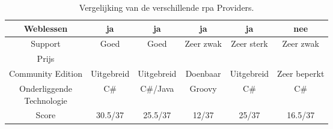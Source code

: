 \begin{sidewaystable}[h!]
\begin{tabular}{|c||c|c|c|c|c|}
		\hline
		Weblessen & ja & ja & ja & ja & nee \\
		\hline
		Support & Goed & Goed & Zeer zwak & Zeer sterk & Zeer zwak \\
		\hline
		Prijs &  &  &  &  & \\
		\hline
		Community Edition & Uitgebreid & Uitgebreid & Doenbaar & Uitgebreid & Zeer beperkt \\
		\hline
		\makecell{Onderliggende\\Technologie} & C\# & C\#/Java & Groovy & C\# & C\# \\
		\hline
		\hline
		Score & 30.5/37 & 25.5/37 & 12/37 & 25/37 & 16.5/37 \\
		\hline
	\end{tabular}
	\caption{Vergelijking van de verschillende \acrshort{rpa} Providers.}
	\label{Vergelijking}
\end{sidewaystable}
